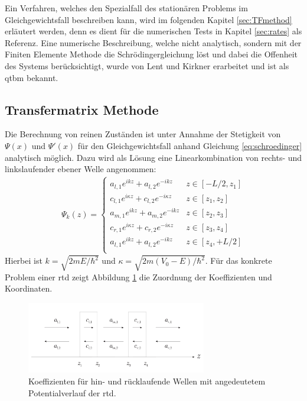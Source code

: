 Ein Verfahren, welches den Spezialfall des stationären Problems im Gleichgewichtsfall beschreiben kann, wird im folgenden Kapitel \ref{sec:TFmethod} erläutert werden, denn es dient für die numerischen Tests in Kapitel \ref{sec:rates} als Referenz. Eine numerische Beschreibung, welche nicht analytisch, sondern mit der Finiten Elemente Methode die Schrödingergleichung löst und dabei die Offenheit des Systems berücksichtigt, wurde von Lent und Kirkner \cite{qtbm} erarbeitet und ist als \ac{qtbm} bekannt.

\subsection{Transfermatrix Methode}
\label{sec:TFmethod}
Die Berechnung von reinen Zuständen ist unter Annahme der Stetigkeit von $\Psi(x)$ und $\Psi'(x)$ für den Gleichgewichtsfall anhand Gleichung \eqref{eq:schroedinger} analytisch möglich. Dazu wird als Lösung eine Linearkombination von rechts- und linkslaufender ebener Welle angenommen:
\begin{equation*}
  \begin{aligned}
    \Psi_k(z)=
    \begin{cases}
    a_{l,1}e^{ikz} + a_{l,2}e^{-ikz}              & z\in[-L/2,z_1] \\
    c_{l,1}e^{i\kappa z} + c_{l,2}e^{-i\kappa z}  & z\in[z_1, z_2] \\
    a_{m,1}e^{ikz} + a_{m,2}e^{-ikz}              & z\in[z_2,z_3] \\
    c_{r,1}e^{i\kappa z} + c_{r,2}e^{-i\kappa z}  & z\in[z_3, z_4] \\
    a_{l,1}e^{ikz} + a_{l,2}e^{-ikz}              & z\in[z_4, +L/2] \\
    \end{cases}
  \end{aligned}
\end{equation*}
Hierbei ist $k=\sqrt{2mE/\hbar^2}$ und $\kappa=\sqrt{2m(V_0-E)/\hbar^2}$.
Für das konkrete Problem einer \ac{rtd} zeigt Abbildung \ref{fig:tf1} die Zuordnung der Koeffizienten und Koordinaten.
\begin{figure}
  \centering
  \includegraphics[width=0.7\textwidth]{files/TF_variables.pdf}
  \caption{Koeffizienten für hin- und rücklaufende Wellen mit angedeutetem Potentialverlauf der \ac{rtd}.}
  \label{fig:tf1}
\end{figure}
